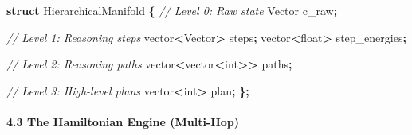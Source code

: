 \documentclass[
  11pt,
  a4paper,
]{article}
\newenvironment{Shaded}{\begin{snugshade}}{\end{snugshade}}
\newcommand{\CommentTok}[1]{\textcolor[rgb]{0.56,0.35,0.01}{\textit{#1}}}
\newcommand{\DataTypeTok}[1]{\textcolor[rgb]{0.13,0.29,0.53}{#1}}
\newcommand{\KeywordTok}[1]{\textcolor[rgb]{0.13,0.29,0.53}{\textbf{#1}}}
\newcommand{\NormalTok}[1]{#1}
\newcommand{\OperatorTok}[1]{\textcolor[rgb]{0.81,0.36,0.00}{\textbf{#1}}}
\begin{document}
\begin{Shaded}
\begin{Highlighting}[]
\KeywordTok{struct}\NormalTok{ HierarchicalManifold }\OperatorTok{\{}
    \CommentTok{// Level 0: Raw state}
\NormalTok{    Vector c\_raw}\OperatorTok{;}
    
    \CommentTok{// Level 1: Reasoning steps}
\NormalTok{    vector}\OperatorTok{\textless{}}\NormalTok{Vector}\OperatorTok{\textgreater{}}\NormalTok{ steps}\OperatorTok{;}
\NormalTok{    vector}\OperatorTok{\textless{}}\DataTypeTok{float}\OperatorTok{\textgreater{}}\NormalTok{ step\_energies}\OperatorTok{;}
    
    \CommentTok{// Level 2: Reasoning paths}
\NormalTok{    vector}\OperatorTok{\textless{}}\NormalTok{vector}\OperatorTok{\textless{}}\DataTypeTok{int}\OperatorTok{\textgreater{}\textgreater{}}\NormalTok{ paths}\OperatorTok{;}
    
    \CommentTok{// Level 3: High{-}level plans}
\NormalTok{    vector}\OperatorTok{\textless{}}\DataTypeTok{int}\OperatorTok{\textgreater{}}\NormalTok{ plan}\OperatorTok{;}
\OperatorTok{\};}
\end{Highlighting}
\end{Shaded}

\paragraph{4.3 The Hamiltonian Engine
(Multi-Hop)}\label{the-hamiltonian-engine-multi-hop}
\end{document}
